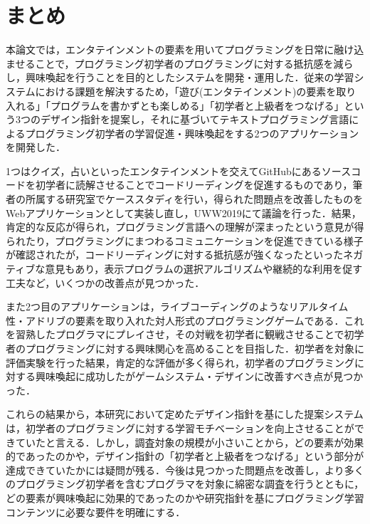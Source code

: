 \section{まとめ}

本論文では，エンタテインメントの要素を用いてプログラミングを日常に融け込ませることで，プログラミング初学者のプログラミングに対する抵抗感を減らし，興味喚起を行うことを目的としたシステムを開発・運用した．従来の学習システムにおける課題を解決するため，「遊び(エンタテインメント)の要素を取り入れる」「プログラムを書かずとも楽しめる」「初学者と上級者をつなげる」という3つのデザイン指針を提案し，それに基づいてテキストプログラミング言語によるプログラミング初学者の学習促進・興味喚起をする2つのアプリケーションを開発した．

1つはクイズ，占いといったエンタテインメントを交えてGitHubにあるソースコードを初学者に読解させることでコードリーディングを促進するものであり，筆者の所属する研究室でケーススタディを行い，得られた問題点を改善したものをWebアプリケーションとして実装し直し，UWW2019にて議論を行った．結果，肯定的な反応が得られ，プログラミング言語への理解が深まったという意見が得られたり，プログラミングにまつわるコミュニケーションを促進できている様子が確認されたが，コードリーディングに対する抵抗感が強くなったといったネガティブな意見もあり，表示プログラムの選択アルゴリズムや継続的な利用を促す工夫など，いくつかの改善点が見つかった．

また2つ目のアプリケーションは，ライブコーディングのようなリアルタイム性・アドリブの要素を取り入れた対人形式のプログラミングゲームである．これを習熟したプログラマにプレイさせ，その対戦を初学者に観戦させることで初学者のプログラミングに対する興味関心を高めることを目指した．初学者を対象に評価実験を行った結果，肯定的な評価が多く得られ，初学者のプログラミングに対する興味喚起に成功したがゲームシステム・デザインに改善すべき点が見つかった．


これらの結果から，本研究において定めたデザイン指針を基にした提案システムは，初学者のプログラミングに対する学習モチベーションを向上させることができていたと言える．しかし，調査対象の規模が小さいことから，どの要素が効果的であったのかや，デザイン指針の「初学者と上級者をつなげる」という部分が達成できていたかには疑問が残る．今後は見つかった問題点を改善し，より多くのプログラミング初学者を含むプログラマを対象に綿密な調査を行うとともに，どの要素が興味喚起に効果的であったのかや研究指針を基にプログラミング学習コンテンツに必要な要件を明確にする．